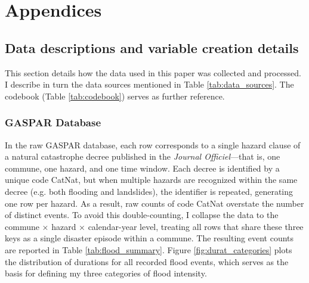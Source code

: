\chapter*{\LARGE Appendices}


\renewcommand{\thesection}{\Alph{section}}
\adjustmtc 
\minitoc
\setcounter{tocdepth}{2}

\section{Data descriptions and variable creation details}


This section details how the data used in this paper was collected and processed. I describe in turn the data sources mentioned in Table \ref{tab:data_sources}. The codebook (Table \ref{tab:codebook}) serves as further reference.

\subsection{GASPAR Database}

In the raw GASPAR database, each row corresponds to a single hazard clause of a natural catastrophe decree published in the \textit{Journal Officiel}—that is, one commune, one hazard, and one time window. Each decree is identified by a unique code CatNat, but when multiple hazards are recognized within the same decree (e.g. both flooding and landslides), the identifier is repeated, generating one row per hazard. As a result, raw counts of code CatNat overstate the number of distinct events. To avoid this double-counting, I collapse the data to the commune × hazard × calendar-year level, treating all rows that share these three keys as a single disaster episode within a commune. The resulting event counts are reported in Table \ref{tab:flood_summary}. Figure \ref{fig:durat_categories} plots the distribution of durations for all recorded flood events, which serves as the basis for defining my three categories of flood intensity. \\


